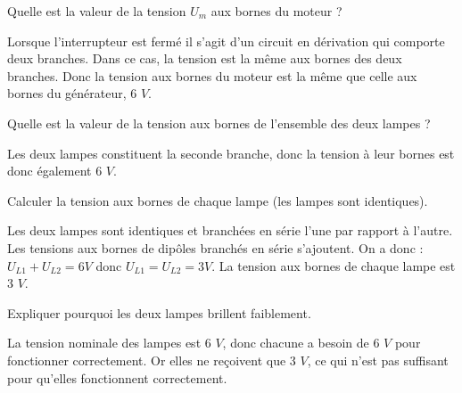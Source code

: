 \documentclass[a4paper,11pt]{exam}
\begin{document}
\begin{questions}
	\question Quelle est la valeur de la tension $U_m$ aux bornes du moteur ?
	\begin{solution}
		Lorsque l'interrupteur est fermé il s'agit d'un circuit en dérivation qui comporte deux branches. Dans ce cas, la tension est la même aux bornes des deux branches. Donc la tension aux bornes du moteur est la même que celle aux bornes du générateur, 6 $V$.
	\end{solution}
	
	\question Quelle est la valeur de la tension aux bornes de l'ensemble des deux lampes ?
	\begin{solution}
		Les deux lampes constituent la seconde branche, donc la tension à leur bornes est donc également 6 $V$.
	\end{solution}
	
	\question Calculer la tension aux bornes de chaque lampe (les lampes sont identiques).
	\begin{solution}
		Les deux lampes sont identiques et branchées en série l'une par rapport à l'autre. Les tensions aux bornes de dipôles branchés en série s'ajoutent. On a donc : $U_{L1} + U_{L2} = 6 V$ donc $U_{L1} = U_{L2} = 3 V$. La tension aux bornes de chaque lampe est 3 $V$.
		
	\end{solution}
	
	\question Expliquer pourquoi les deux lampes brillent faiblement.
	\begin{solution}
		La tension nominale des lampes est 6 $V$, donc chacune a besoin de 6 $V$ pour fonctionner correctement. Or elles ne reçoivent que 3 $V$, ce qui n'est pas suffisant pour qu'elles fonctionnent correctement.
	\end{solution}
\end{questions}
\end{document}
